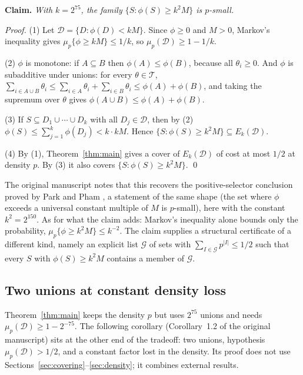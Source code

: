 \documentclass[11pt,letterpaper]{article}
\theoremstyle{definition}
\theoremstyle{remark}
\numberwithin{equation}{section}
\begin{document}
\smallskip
\noindent\textbf{Claim.} \emph{With $k=2^{75}$, the family
$\{S:\phi(S)\ge k^2M\}$ is $p$-small.}

\smallskip
\noindent\emph{Proof.}
(1) Let $\mathcal D=\{D:\phi(D)<kM\}$. Since $\phi\ge0$ and $M>0$,
Markov's inequality gives $\mu_p\{\phi\ge kM\}\le1/k$, so
$\mu_p(\mathcal D)\ge1-1/k$.

(2) $\phi$ is monotone: if $A\subseteq B$ then $\phi(A)\le\phi(B)$,
because all $\theta_i\ge0$. And $\phi$ is subadditive under unions: for
every $\theta\in\mathcal T$,
$\sum_{i\in A\cup B}\theta_i\le\sum_{i\in A}\theta_i+\sum_{i\in B}\theta_i
\le\phi(A)+\phi(B)$, and taking the supremum over $\theta$ gives
$\phi(A\cup B)\le\phi(A)+\phi(B)$.

(3) If $S\subseteq D_1\cup\cdots\cup D_k$ with all $D_j\in\mathcal D$,
then by (2) $\phi(S)\le\sum_{j=1}^k\phi(D_j)<k\cdot kM$. Hence
$\{S:\phi(S)\ge k^2M\}\subseteq E_k(\mathcal D)$.

(4) By (1), Theorem~\ref{thm:main} gives a cover of $E_k(\mathcal D)$ of
cost at most $1/2$ at density $p$. By (3) it also covers
$\{S:\phi(S)\ge k^2M\}$. \qed

\smallskip
The original manuscript notes that this recovers the positive-selector
conclusion proved by Park and Pham \cite[Theorem~1.2]{ParkPham24}, a
statement of the same shape (the set where $\phi$ exceeds a universal
constant multiple of $M$ is $p$-small), here with the constant
$k^2=2^{150}$. As for what the claim adds: Markov's inequality alone
bounds only the probability, $\mu_p\{\phi\ge k^2M\}\le k^{-2}$. The claim
supplies a structural certificate of a different kind, namely an explicit
list $\mathcal G$ of sets with $\sum_{I\in\mathcal G}p^{|I|}\le1/2$ such
that every $S$ with $\phi(S)\ge k^2M$ contains a member of $\mathcal G$.

\subsection{Two unions at constant density loss}
\label{sec:two-union}

Theorem~\ref{thm:main} keeps the density $p$ but uses $2^{75}$ unions and
needs $\mu_p(\mathcal D)\ge1-2^{-75}$. The following corollary
(Corollary~1.2 of the original manuscript) sits at the other end of the
tradeoff: two unions, hypothesis $\mu_p(\mathcal D)>1/2$, and a constant
factor lost in the density. Its proof does not use
Sections~\ref{sec:covering}--\ref{sec:density}; it combines external
results.
\end{document}
